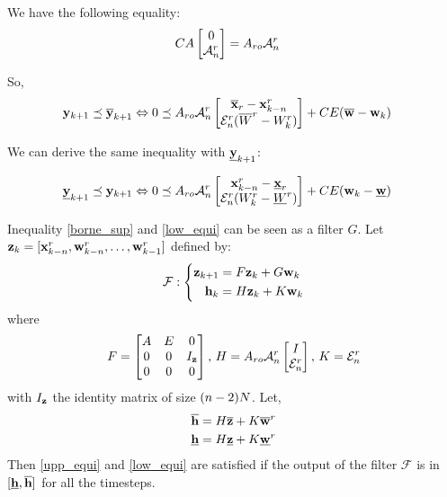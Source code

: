 \documentclass{article}
\theoremstyle{named}
\begin{document}
We have the following equality:
\begin{align*}
C A \begin{bmatrix} 0 \\ \mathcal{A}^r_n \end{bmatrix} 
& = A_{ro} \mathcal{A}^r_n
\end{align*}

So,
\begin{equation}\label{upp_equi}
\begin{split}
 \mathbf{y}_{k+1} \preceq \overline{ \mathbf{y}}_{k+1}
& \Leftrightarrow
0 \preceq
A_{ro} \mathcal{A}^r_n
\begin{bmatrix}
\overline{ \mathbf{x}}_r -  \mathbf{x}^r_{k-n} \\
\mathcal{E}^r_n (\overline{W}^r - W^r_k)
\end{bmatrix}
+ C E (\overline{ \mathbf{w}} - \mathbf{w}_k)
\end{split}
\end{equation}

We can derive the same inequality with $\underline{ \mathbf{y}}_{k+1}$:

\begin{equation}\label{low_equi}
\begin{split}
\underline{ \mathbf{y}}_{k+1} \preceq  \mathbf{y}_{k+1}
& \Leftrightarrow
0 \preceq
A_{ro} \mathcal{A}^r_n
\begin{bmatrix}
 \mathbf{x}^r_{k-n} - \underline{ \mathbf{x}}_r \\
\mathcal{E}^r_n (W^r_k - \underline{W}^r)
\end{bmatrix}
+ C E ( \mathbf{w}_k - \underline{ \mathbf{w}})
\end{split}
\end{equation}

\newcommand{\filter}{\mathcal{F}}
Inequality \ref{borne_sup} and \ref{low_equi} can be seen as a filter $G$. Let $ \mathbf{z}_k=[ \mathbf{x}^r_{k-n}, \mathbf{w}^r_{k-n},\dots, \mathbf{w}^r_{k-1}]$  defined by:
\begin{equation}
\filter:
\left\{
\begin{split}
\zkn &= F \zk + G \wk \\
\hk &= H \zk + K \wk \\
\end{split}
\right.
\end{equation}
where
\begin{equation}
F = \begin{bmatrix}
A & E & 0\\
0 & 0 & I_{ \mathbf{z}}\\
0 & 0 & 0 \\
\end{bmatrix}
\textrm{, }
H = 
A_{ro} \mathcal{A}^r_n
\begin{bmatrix}
I \\
\mathcal{E}^r_n
\end{bmatrix}
\textrm{, }
K = \mathcal{E}^r_n
\end{equation}
with $I_{ \mathbf{z}}$ the identity matrix of size $(n-2)N$.
Let,
\begin{align*}
\overline{ \mathbf{h}} &= H \overline{ \mathbf{z}} + K \overline{ \mathbf{w}}^r\\
\underline{ \mathbf{h}} &= H \underline{ \mathbf{z}} + K \underline{ \mathbf{w}}^r
\end{align*}
Then \ref{upp_equi} and \ref{low_equi} are satisfied if the output of the filter $\filter$ is in $[\underline{ \mathbf{h}},\overline{ \mathbf{h}}]$ for all the timesteps.
\end{document}
